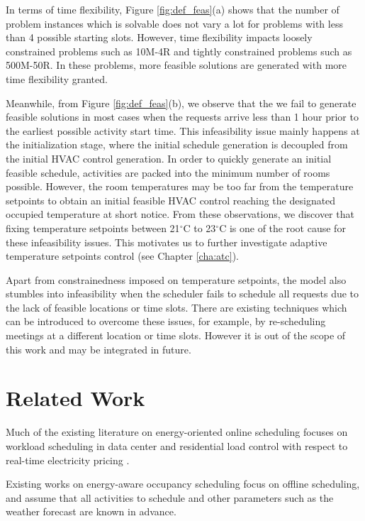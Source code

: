 In terms of time flexibility, Figure \ref{fig:def_feas}(a) shows that the number of problem instances which is solvable  does not vary a lot for problems with less than 4 possible starting slots. However, time flexibility impacts loosely constrained problems such as 10M-4R and tightly constrained problems such as 500M-50R. In these problems, more feasible solutions are generated with more time flexibility granted. 

Meanwhile, from Figure \ref{fig:def_feas}(b), we observe that the we fail to generate feasible solutions in most cases when the requests arrive less than 1 hour prior to the earliest possible activity start time. This infeasibility issue mainly happens at the initialization stage, where the initial schedule generation is decoupled from the initial HVAC control generation. In order to quickly generate an initial feasible schedule, activities are packed into the minimum number of rooms possible. However, the room temperatures may be too far from the temperature setpoints to obtain an initial feasible HVAC control reaching the designated occupied temperature at short notice. From these observations, we discover that fixing temperature setpoints between 21$^\circ$C to 23$^\circ$C is one of the root cause for these infeasibility issues. This motivates us to further investigate adaptive temperature setpoints control (see Chapter \ref{cha:atc}).

Apart from constrainedness imposed on temperature setpoints, the model also stumbles into infeasibility when the scheduler fails to schedule all requests due to the lack of feasible locations or time slots. There are existing techniques which can be introduced to overcome these issues, for example, by re-scheduling meetings at a different location or time slots. However it is out of the scope of this work and may be integrated in future. 
 

\section{Related Work} \label{sec:online:related_work}

Much of the existing literature on energy-oriented online scheduling focuses on workload scheduling in data center \citep{wang2009towards,kliazovich2013dens} and residential load control with respect to real-time electricity pricing \citep{mohsenian2010optimal,scott2013residential}. 

Existing works on energy-aware occupancy scheduling \citep{chai2014minimizing,lim2015hvac,lim2015large,majumdar2016characterising,majumdar2012energy,pan2013minimizing,pan2012thermal} focus on offline scheduling, and assume that all activities to schedule and other parameters such as the weather forecast are known in advance.

